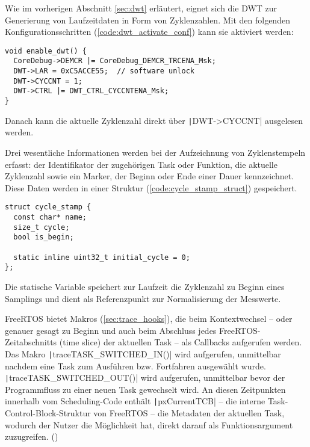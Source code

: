 Wie im vorherigen Abschnitt \ref{sec:dwt} erläutert, eignet sich die DWT zur
Generierung von Laufzeitdaten in Form von Zyklenzahlen. Mit den folgenden
Konfigurationsschritten (\ref{code:dwt_activate_conf}) kann sie aktiviert
werden:

\begin{code}
\begin{verbatim}
void enable_dwt() {
  CoreDebug->DEMCR |= CoreDebug_DEMCR_TRCENA_Msk;
  DWT->LAR = 0xC5ACCE55;  // software unlock
  DWT->CYCCNT = 1;
  DWT->CTRL |= DWT_CTRL_CYCCNTENA_Msk;
}
\end{verbatim}
    \label{code:dwt_activate_conf}
\end{code}

Danach kann die aktuelle Zyklenzahl direkt über \texttt|DWT->CYCCNT|
ausgelesen werden.

Drei wesentliche Informationen werden bei der Aufzeichnung von Zyklenstempeln
erfasst: der Identifikator der zugehörigen Task oder Funktion, die aktuelle
Zyklenzahl sowie ein Marker, der Beginn oder Ende einer Dauer kennzeichnet.
Diese Daten werden in einer Struktur (\ref{code:cycle_stamp_struct})
gespeichert.

\begin{code}
\begin{verbatim}
struct cycle_stamp {
  const char* name;
  size_t cycle;
  bool is_begin;

  static inline uint32_t initial_cycle = 0;
};
\end{verbatim}
    \label{code:cycle_stamp_struct}
\end{code}

Die statische Variable speichert zur Laufzeit die Zyklenzahl zu Beginn eines
Samplings und dient als Referenzpunkt zur Normalisierung der Messwerte.

FreeRTOS bietet Makros (\ref{sec:trace_hooks}), die beim Kontextwechsel -- oder
genauer gesagt zu Beginn und auch beim Abschluss jedes FreeRTOS-Zeitabschnitts
(time slice) der aktuellen Task -- als Callbacks aufgerufen werden. Das Makro
\texttt|traceTASK_SWITCHED_IN()| wird aufgerufen, unmittelbar nachdem
eine Task zum Ausführen bzw. Fortfahren ausgewählt wurde.
\texttt|traceTASK_SWITCHED_OUT()| wird aufgerufen, unmittelbar bevor
der Programmfluss zu einer neuen Task gewechselt wird. An diesen Zeitpunkten
innerhalb vom Scheduling-Code enthält \texttt|pxCurrentTCB| -- die
interne Task-Control-Block-Struktur von FreeRTOS -- die Metadaten der aktuellen
Task, wodurch der Nutzer die Möglichkeit hat, direkt darauf als
Funktionsargument zuzugreifen. (\cite{freertos_rtos_trace_hooks})

